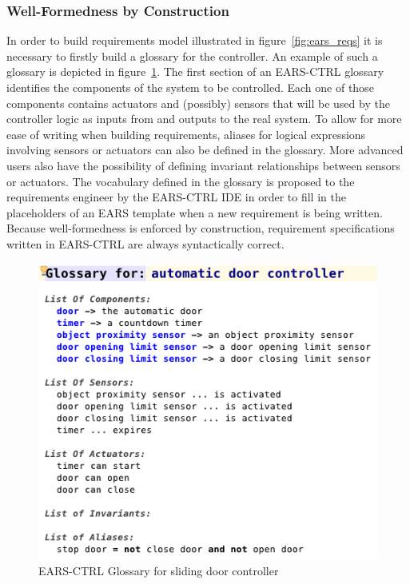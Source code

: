 \subsubsection{Well-Formedness by Construction}
\vspace{-0cm}In order to build requirements model illustrated in
figure~\ref{fig:ears_reqs} it is necessary to firstly build a glossary
for the controller. An example of such a glossary is depicted in
figure~\ref{fig:ears_glossary}. The first section of an \textsf{EARS-CTRL}
glossary identifies the components of the system to be controlled. Each one of
those components contains actuators and (possibly) sensors that will be used by
the controller logic as inputs from and outputs to the real system. To allow for
more ease of writing when building requirements, aliases for logical expressions
involving sensors or actuators can also be defined in the glossary. More
advanced users also have the possibility of defining invariant relationships
between sensors or actuators.
The vocabulary defined in the glossary is proposed to the requirements engineer
by the \textsf{EARS-CTRL} IDE in order to fill in the placeholders of an EARS
template when a new requirement is being written. Because well-formedness is
enforced by construction, requirement specifications written in
\textsf{EARS-CTRL} are always syntactically correct.\vspace{-.4cm}
\begin{figure}[h!]
   \begin{center}
     \includegraphics[width=.5\textwidth]{images/glossary.png}
     \caption{\textsf{EARS-CTRL} Glossary for sliding door
     controller}
     \label{fig:ears_glossary}
   \end{center}
   \vspace{-1.5cm}
 \end{figure} 
